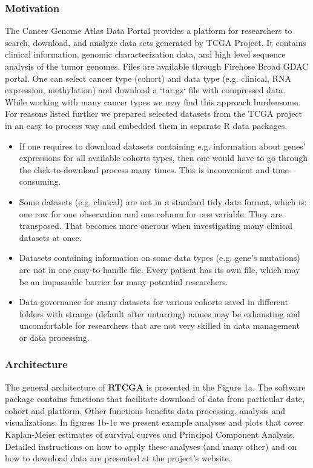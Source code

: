 \documentclass{bioinfo}
\begin{document}
\subsubsection*{Motivation}
The Cancer Genome Atlas Data Portal provides a platform for researchers to search, download, and analyze data sets generated by TCGA Project. It contains clinical information, genomic characterization data, and high level sequence analysis of the tumor genomes. Files are available through Firehose Broad GDAC portal. One can select cancer type (cohort) and data type (e.g. clinical, RNA expression, methylation) and download a `tar.gz` file with compressed data. While working with many cancer types we may find this approach burdensome. For reasons listed further we prepared selected datasets from the TCGA project in an easy to process way and embedded them in separate R data packages. 
\begin{itemize}
\item If one requires to download datasets containing e.g. information about genes' expressions for all available cohorts types, then one would have to go through the click-to-download process many times. This is inconvenient and time-consuming.
\item Some datasets (e.g. clinical) are not in a standard tidy data format, which is: one row for one observation and one column for one variable. They are transposed. That becomes more onerous when investigating many clinical datasets at once.
\item Datasets containing information on some data types (e.g. gene's mutations) are not in one easy-to-handle file. Every patient has its own file, which may be an impassable barrier for many potential researchers. 
\item Data governance for many datasets for various cohorts saved in different folders with strange (default after untarring) names may be exhausting and uncomfortable for researchers that are not very skilled in data management or data processing.
\end{itemize}

\subsubsection*{Architecture}
The general architecture of \textbf{RTCGA} is presented in the Figure 1a. The software package contains functions that facilitate download of data from particular date, cohort and platform. Other functions benefits data processing, analysis and visualizations. In figures 1b-1c we present example analyses and plots that cover Kaplan-Meier estimates of survival curves and Principal Component Analysis. Detailed instructions on how to apply these analyses (and many other) and on how to download data are presented at the project's website.
\end{document}
